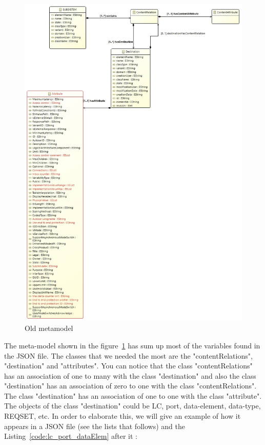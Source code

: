 \begin{figure}[H]
\centering
\captionsetup{justification=centering}
\vspace{0cm}%
\includegraphics[width=0.85\linewidth]{figure/new_model/Old_Metamodel.jpg}
\caption{Old metamodel}
\label{fig:old_metamodel}
\end{figure}

The meta-model shown in the figure~\ref{fig:old_metamodel} has sum up most of the variables found in the JSON file. The classes that we needed the most are the "contentRelations", "destination" and "attributes". You can notice that the class "contentRelations" has an association of one to many with the class "destination" and also the class "destination" has an association of zero to one with the class "contentRelations". The class "destination" has an association of one to one with the class "attribute". \\

The objects of the class "destination" could be LC, port, data-element, data-type, REQSET, etc. In order to elaborate this, we will give an example of how it appears in a JSON file (see the lists that follows) and the Listing~\ref{code:lc_port_dataElem} after it : \\

